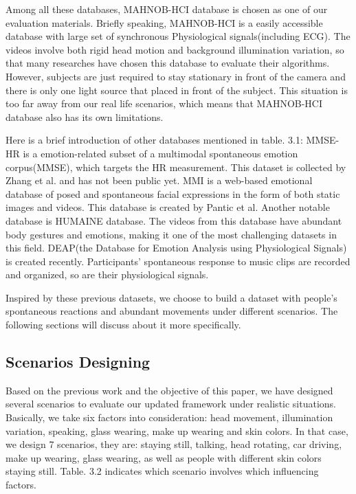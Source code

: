 Among all these databases, MAHNOB-HCI database is chosen as one of our evaluation materials. Briefly speaking, MAHNOB-HCI is a easily accessible database with large set of synchronous Physiological signals(including ECG). The videos involve both rigid head motion and background illumination variation, so that many researches have chosen this database to evaluate their algorithms. However, subjects are just required to stay stationary in front of the camera and there is only one light source that placed in front of the subject. This situation is too far away from our real life scenarios, which means that MAHNOB-HCI database also has its own limitations.

Here is a brief introduction of other databases mentioned in table. 3.1: MMSE-HR is a emotion-related subset of a multimodal spontaneous emotion corpus(MMSE), which targets the HR measurement. This dataset is collected by Zhang et al.\cite{zhang2016multimodal} and has not been public yet. MMI is a web-based emotional database of posed and spontaneous facial expressions in the form of both static images and videos. This database is created by Pantic et al.\cite{valstar2010induced}
Another notable database is HUMAINE database\cite{douglas2007humaine}. The videos from this database have abundant body gestures and emotions, making it one of the most challenging datasets in this field. DEAP(the Database for Emotion Analysis using Physiological Signals)\cite{koelstra2012deap} is created recently. Participants' spontaneous response to music clips are recorded and organized, so are their physiological signals.

Inspired by these previous datasets, we choose to build a dataset with people's spontaneous reactions and abundant movements under different scenarios. The following sections will discuss about it more specifically.

\subsection{Scenarios Designing}
Based on the previous work and the objective of this paper, we have designed several scenarios to evaluate our updated framework under realistic situations. Basically, we take six factors into consideration: head movement, illumination variation, speaking, glass wearing, make up wearing and skin colors. In that case, we design 7 scenarios, they are: staying still, talking, head rotating, car driving, make up wearing, glass wearing, as well as people with different skin colors staying still. Table. 3.2 indicates which scenario involves which influencing factors.



